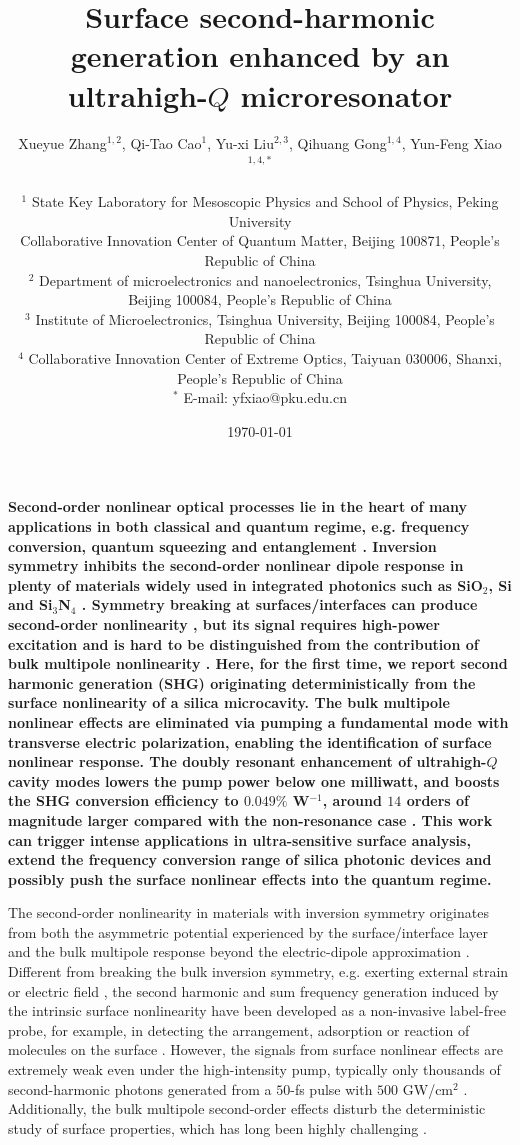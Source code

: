 \documentclass[a4paper,8pt,hyperref, twocolumn, aps, prl]{article}
\title{\bfseries \Large 
Surface second-harmonic generation enhanced by an ultrahigh-$Q$ microresonator
}
\author{\normalsize  Xueyue Zhang$^{1,2}$, Qi-Tao Cao$^{1}$, Yu-xi Liu$^{2,3}$, Qihuang Gong$^{1,4}$, Yun-Feng Xiao$^{1,4,*}$ \\
  \\
\normalsize $^1$ State Key Laboratory for Mesoscopic Physics and School of Physics, Peking University \\
\normalsize Collaborative Innovation Center of Quantum Matter, Beijing 100871, People's Republic of China \\
\normalsize $^2$ Department of microelectronics and nanoelectronics, Tsinghua University, Beijing 100084, People’s Republic of China \\
\normalsize $^3$ Institute of Microelectronics, Tsinghua University, Beijing 100084, People’s Republic of China \\
\normalsize $^4$ Collaborative Innovation Center of Extreme Optics, Taiyuan 030006, Shanxi, People’s Republic of China \\
\normalsize $^*$ E-mail: yfxiao@pku.edu.cn
}
\date{\normalsize \today}
\begin{document}
\maketitle


\textbf{
Second-order nonlinear optical processes lie in the heart of many applications in both classical and quantum regime, e.g. frequency conversion,  quantum squeezing and entanglement \cite{boyd2003nonlinear, pereira1988generation, kwiat1995new}. 
Inversion symmetry inhibits the second-order nonlinear dipole response in plenty of materials widely used in integrated photonics such as SiO$_2$, Si and Si$_3$N$_4$ \cite{boyd2003nonlinear, leuthold2010nonlinear, moss2013new}.
Symmetry breaking at surfaces/interfaces can produce second-order nonlinearity \cite{shen1989surface, heinz1991second, bloembergen1968optical, cazzanelli2016second}, but its signal requires high-power excitation and is hard to be distinguished from the contribution of bulk multipole nonlinearity \cite{heinz1991second, sun2015surface}. 
Here, for the first time, we report second harmonic generation (SHG) originating deterministically from the surface nonlinearity of a silica microcavity.
The bulk multipole nonlinear effects are eliminated via pumping a fundamental mode with transverse electric polarization, enabling the identification of surface nonlinear response.
The doubly resonant enhancement of ultrahigh-$Q$ cavity modes lowers the pump power below one milliwatt, and boosts the SHG conversion efficiency to $0.049\%$ W$^{-1}$, around $14$ orders of magnitude larger compared with the non-resonance case \cite{tian2014recent}. 
This work can trigger intense applications in ultra-sensitive surface analysis, extend the frequency conversion range of silica photonic devices and possibly push the surface nonlinear effects into the quantum regime.
}

The second-order nonlinearity in materials with inversion symmetry originates from both the asymmetric potential experienced by the surface/interface layer and the bulk multipole response beyond the electric-dipole approximation \cite{shen1989surface, heinz1991second}. 
Different from breaking the bulk inversion symmetry, e.g. exerting external strain \cite{jacobsen2006strained, cazzanelli2012second} or electric field \cite{timurdogan2017electric}, the second harmonic and sum frequency generation induced by the intrinsic surface nonlinearity have been developed as a non-invasive label-free probe, for example, in detecting the arrangement,  adsorption or reaction of molecules on the surface \cite{sun2015surface, heinz1983determination, corn1994optical}.  
However, the signals from surface nonlinear effects are extremely weak even under the high-intensity pump, typically only thousands of second-harmonic photons generated from a $50$-fs pulse with $500$ GW/cm$^{2}$ \cite{tian2014recent}. 
Additionally, the bulk multipole second-order effects disturb the deterministic study of surface properties, which has long been highly challenging \cite{heinz1991second, tian2014recent}.
\end{document}
